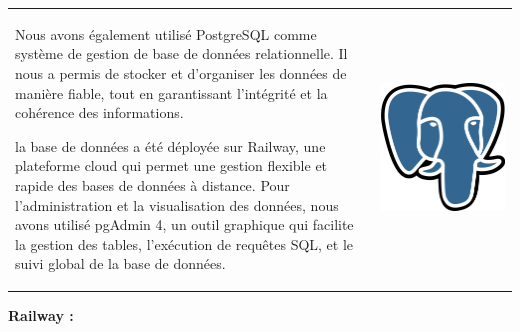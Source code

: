 \documentclass{article}
\begin{document}
\noindent
\begin{tabular}
{@{}m{}@{\hspace{1em}}m{}@{}}
Nous avons également utilisé PostgreSQL comme système de gestion de base de données relationnelle. Il nous a permis de stocker et d’organiser les données de manière fiable, tout en garantissant l’intégrité et la cohérence des informations. 

la base de données a été déployée sur Railway, une plateforme cloud qui permet une gestion flexible et rapide des bases de données à distance.
Pour l’administration et la visualisation des données, nous avons utilisé pgAdmin 4, un outil graphique qui facilite la gestion des tables, l’exécution de requêtes SQL, et le suivi global de la base de données.
&
\includegraphics[width=\linewidth]{postgre.png} %
\end{tabular}

\vspace{0,8cm}

\noindent \large \textbf {Railway \cite{Railway}:}

\vspace{0,3cm}
\end{document}
